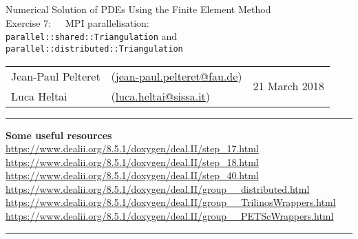 \documentclass[11pt,answers]{exam}
\makeatletter
\newcommand{\makeheader}[3]{%
\setcounter{question}{0}
\begin{center}
{\sc Numerical Solution of PDEs Using the Finite Element Method}\vspace{2ex}\\
{\sc Exercise #1:\ \ \ #2}\vspace{2ex}\\
\begin{tabular*}{\textwidth}{ll @{\extracolsep{\fill}}r}
Jean-Paul Pelteret & (\url{jean-paul.pelteret@fau.de}) & \multirow{2}{*}{#3} \\
Luca Heltai & (\url{luca.heltai@sissa.it}) & \\
\end{tabular*}
\end{center}
}
\newcommand{\makeresources}[1]{%
\rule{\textwidth}{0.6mm}
\textbf{Some useful resources}\\[1.5ex]
#1 \\
\rule{\textwidth}{0.6mm}
}
\makeatother
\begin{document}


\clearpage
\makeheader{7}{MPI parallelisation: \\\texttt{parallel::shared::Triangulation} and \texttt{parallel::distributed::Triangulation}}{21 March 2018}
\makeresources{%
\url{https://www.dealii.org/8.5.1/doxygen/deal.II/step_17.html} \\
\url{https://www.dealii.org/8.5.1/doxygen/deal.II/step_18.html} \\
\url{https://www.dealii.org/8.5.1/doxygen/deal.II/step_40.html} \\
\url{https://www.dealii.org/8.5.1/doxygen/deal.II/group__distributed.html} \\
\url{https://www.dealii.org/8.5.1/doxygen/deal.II/group__TrilinosWrappers.html} \\
\url{https://www.dealii.org/8.5.1/doxygen/deal.II/group__PETScWrappers.html}
}





\end{document}
